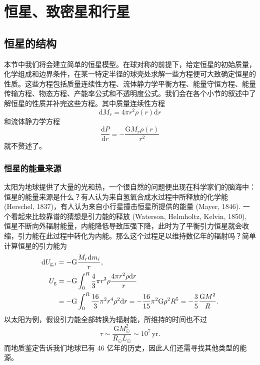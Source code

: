 \documentclass[../天体物理基础.tex]{subfiles}
\begin{document}
\section{恒星、致密星和行星}
\subsection{恒星的结构}
本节中我们将会建立简单的恒星模型。在球对称的前提下，给定恒星的初始质量，化学组成和边界条件，在某一特定半径的球壳处求解一些方程便可大致确定恒星的性质。这些方程包括质量连续性方程、流体静力学平衡方程、能量守恒方程、能量传输方程、物态方程、产能率公式和不透明度公式。我们会在各个小节的叙述中了解恒星的性质并补完这些方程。其中质量连续性方程
\begin{equation}
\mathrm{d}M_{r}=4\pi r^{2}\rho\left(r\right)\mathrm{d}r
\end{equation}
和流体静力学方程
\begin{equation}
\frac{\mathrm{d}P}{\mathrm{d}r}=-\frac{\mathrm{G}M_{r}\rho\left(r\right)}{r^{2}}\label{2.1.2}
\end{equation}
就不赘述了。

\subsubsection{恒星的能量来源}
太阳为地球提供了大量的光和热，一个很自然的问题便出现在科学家们的脑海中：恒星的能量来源是什么？有人认为来自氢氧合成水过程中所释放的化学能 (Herschel, 1837)，有人认为来自小行星撞击恒星所提供的能量 (Mayer, 1846). 一个看起来比较靠谱的猜想是引力能的释放 (Waterson, Helmholtz, Kelvin, 1850), 恒星不断向外辐射能量，内能降低导致压强下降，此时为了平衡引力恒星就会收缩，引力能在此过程中转化为内能。那么这个过程足以维持数亿年的辐射吗？简单计算恒星的引力能为
\begin{align}
\mathrm{d}U_{\text{g},i}&=-\mathrm{G}\frac{M_{r}\mathrm{d}m_{i}}{r},\notag\\
U_{\text{g}}&=-\mathrm{G}\int_{0}^{R}\frac{4}{3}\pi r^{3}\rho \frac{4\pi r^{2}\rho\mathrm{d}r}{r}\notag\\
&=-\mathrm{G}\int_{0}^{R}\frac{16}{3}\pi^{2}r^{4}\rho^{2}\mathrm{d}r=-\frac{16}{15}\pi^{2}\mathrm{G}\rho^{2}R^{5}=-\frac{3}{5}\frac{\mathrm{G}M^{2}}{R}.
\end{align}
以太阳为例，假设引力能全部转换为辐射能，所维持的时间也不过
\begin{equation}
\tau\sim\frac{\mathrm{G}M_{\odot}^{2}}{R_{\odot}L_{\odot}}\sim10^{7}\,\mathrm{yr}.
\end{equation}
而地质鉴定告诉我们地球已有 46 亿年的历史，因此人们还需寻找其他类型的能源。
\end{document}
